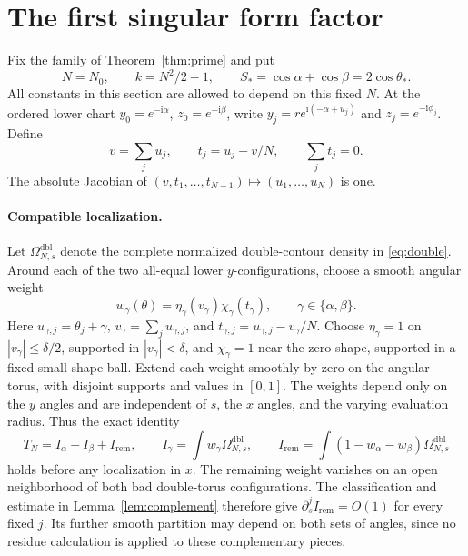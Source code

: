 \documentclass[11pt]{article}
\numberwithin{equation}{section}
\theoremstyle{definition}
\newcommand{\ii}{\mathrm i}
\begin{document}


\section{The first singular form factor}
\label{sec:first}
Fix the family of Theorem~\ref{thm:prime} and put
\[
 N=N_0,\qquad k=N^2/2-1,\qquad
 S_*=\cos\alpha+\cos\beta=2\cos\theta_*.
\]
All constants in this section are allowed to depend on this fixed \(N\).
At the ordered lower chart \(y_0=e^{-\ii\alpha}\),
\(z_0=e^{-\ii\beta}\), write \(y_j=r e^{\ii(-\alpha+u_j)}\) and
\(z_j=e^{-\ii\phi_j}\). Define
\[
 v=\sum_j u_j,\qquad t_j=u_j-v/N,\qquad \sum_jt_j=0.
\]
The absolute Jacobian of \((v,t_1,\ldots,t_{N-1})\mapsto(u_1,\ldots,u_N)\)
is one.

\paragraph{Compatible localization.}
Let \(\Omega^{\mathrm{dbl}}_{N,s}\) denote the complete normalized
double-contour density in \eqref{eq:double}. Around each of the two
all-equal lower \(y\)-configurations, choose a smooth angular weight
\[
 w_\gamma(\theta)=\eta_\gamma(v_\gamma)\chi_\gamma(t_\gamma),
 \qquad \gamma\in\{\alpha,\beta\}.
\]
Here \(u_{\gamma,j}=\theta_j+\gamma\),
\(v_\gamma=\sum_j u_{\gamma,j}\), and
\(t_{\gamma,j}=u_{\gamma,j}-v_\gamma/N\).
Choose \(\eta_\gamma=1\) on \(|v_\gamma|\le\delta/2\), supported
in \(|v_\gamma|<\delta\), and \(\chi_\gamma=1\) near the zero shape,
supported in a fixed small shape ball. Extend each weight smoothly by
zero on the angular torus, with disjoint supports and values in \([0,1]\).
The weights depend only on the \(y\) angles and are independent of
\(s\), the \(x\) angles, and the varying evaluation radius.
Thus the exact identity
\[
 T_N=I_\alpha+I_\beta+I_{\mathrm{rem}},\qquad
 I_\gamma=\int w_\gamma\Omega^{\mathrm{dbl}}_{N,s},\qquad
 I_{\mathrm{rem}}=\int(1-w_\alpha-w_\beta)
                         \Omega^{\mathrm{dbl}}_{N,s}
\]
holds before any localization in \(x\).
The remaining weight vanishes on an open neighborhood of both bad
double-torus configurations. The classification and estimate in
Lemma~\ref{lem:complement} therefore give
\(\partial_s^j I_{\mathrm{rem}}=O(1)\) for every fixed \(j\).
Its further smooth partition may depend on both sets of angles,
since no residue calculation is applied to these complementary pieces.
\end{document}
